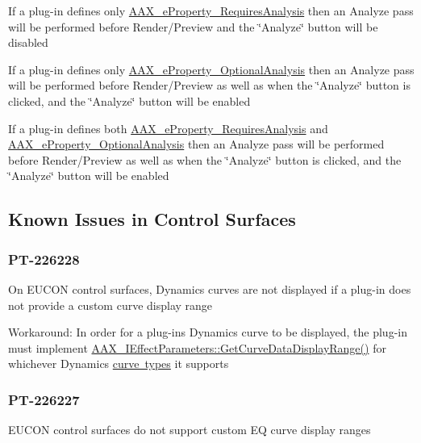 \begin{DoxyItemize}
\item If a plug-\/in defines only \mbox{\hyperlink{a00662_a13e384f22825afd3db6d68395b79ce0da925c49bb79454b33bf1d5f4cb09d373f}{A\+A\+X\+\_\+e\+Property\+\_\+\+Requires\+Analysis}} then an Analyze pass will be performed before Render/\+Preview and the \char`\"{}\+Analyze\char`\"{} button will be disabled \item If a plug-\/in defines only \mbox{\hyperlink{a00662_a13e384f22825afd3db6d68395b79ce0da5a2bacb421fc36f890a121f01a9e72ba}{A\+A\+X\+\_\+e\+Property\+\_\+\+Optional\+Analysis}} then an Analyze pass will be performed before Render/\+Preview as well as when the \char`\"{}\+Analyze\char`\"{} button is clicked, and the \char`\"{}\+Analyze\char`\"{} button will be enabled \item If a plug-\/in defines both \mbox{\hyperlink{a00662_a13e384f22825afd3db6d68395b79ce0da925c49bb79454b33bf1d5f4cb09d373f}{A\+A\+X\+\_\+e\+Property\+\_\+\+Requires\+Analysis}} and \mbox{\hyperlink{a00662_a13e384f22825afd3db6d68395b79ce0da5a2bacb421fc36f890a121f01a9e72ba}{A\+A\+X\+\_\+e\+Property\+\_\+\+Optional\+Analysis}} then an Analyze pass will be performed before Render/\+Preview as well as when the \char`\"{}\+Analyze\char`\"{} button is clicked, and the \char`\"{}\+Analyze\char`\"{} button will be enabled\end{DoxyItemize}
\hypertarget{a00846_knownissues_cs}{}\subsection{Known Issues in Control Surfaces}\label{a00846_knownissues_cs}
\hypertarget{a00846_PT-226228}{}\subsubsection{P\+T-\/226228}\label{a00846_PT-226228}
On E\+U\+C\+ON control surfaces, Dynamics curves are not displayed if a plug-\/in does not provide a custom curve display range

Workaround\+: In order for a plug-\/in\textquotesingle{}s Dynamics curve to be displayed, the plug-\/in must implement \mbox{\hyperlink{a00812_ga38d1ac0c15a7052904077ef0e2527e0d}{A\+A\+X\+\_\+\+I\+Effect\+Parameters\+::\+Get\+Curve\+Data\+Display\+Range()}} for whichever Dynamics \mbox{\hyperlink{a00812_ga59c73d8f51c5c55d54a728eff39da884}{curve types}} it supports\hypertarget{a00846_PT-226227}{}\subsubsection{P\+T-\/226227}\label{a00846_PT-226227}
E\+U\+C\+ON control surfaces do not support custom EQ curve display ranges

